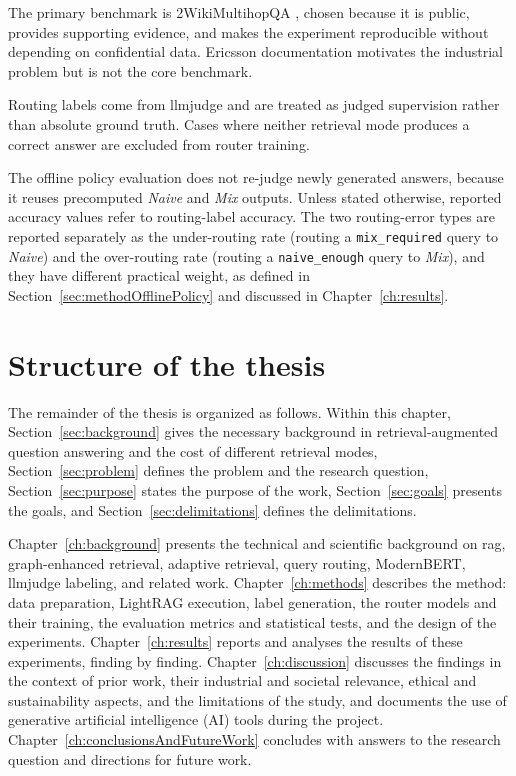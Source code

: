 \documentclass[english, bibtex]{kththesis}               %
\numberwithin{listing}{chapter}
\begin{document}
The primary benchmark is 2WikiMultihopQA \cite{ho2020twowiki}, chosen because it is public, provides supporting evidence, and makes the experiment reproducible without depending on confidential data. Ericsson documentation motivates the industrial problem but is not the core benchmark.

Routing labels come from \gls{llmjudge} and are treated as judged supervision rather than absolute ground truth. Cases where neither retrieval mode produces a correct answer are excluded from router training.

The offline policy evaluation does not re-judge newly generated answers, because it reuses precomputed \emph{Naive} and \emph{Mix} outputs. Unless stated otherwise, reported accuracy values refer to routing-label accuracy. The two routing-error types are reported separately as the under-routing rate (routing a \texttt{mix\_required} query to \emph{Naive}) and the over-routing rate (routing a \texttt{naive\_enough} query to \emph{Mix}), and they have different practical weight, as defined in Section~\ref{sec:methodOfflinePolicy} and discussed in Chapter~\ref{ch:results}.

\section{Structure of the thesis}
\label{sec:structure}

The remainder of the thesis is organized as follows. Within this chapter, Section~\ref{sec:background} gives the necessary background in retrieval-augmented question answering and the cost of different retrieval modes, Section~\ref{sec:problem} defines the problem and the research question, Section~\ref{sec:purpose} states the purpose of the work, Section~\ref{sec:goals} presents the goals, and Section~\ref{sec:delimitations} defines the delimitations.

Chapter~\ref{ch:background} presents the technical and scientific background on \gls{rag}, graph-enhanced retrieval, adaptive retrieval, query routing, ModernBERT, \gls{llmjudge} labeling, and related work. Chapter~\ref{ch:methods} describes the method: data preparation, LightRAG execution, label generation, the router models and their training, the evaluation metrics and statistical tests, and the design of the experiments. Chapter~\ref{ch:results} reports and analyses the results of these experiments, finding by finding. Chapter~\ref{ch:discussion} discusses the findings in the context of prior work, their industrial and societal relevance, ethical and sustainability aspects, and the limitations of the study, and documents the use of generative artificial intelligence (AI) tools during the project. Chapter~\ref{ch:conclusionsAndFutureWork} concludes with answers to the research question and directions for future work.
\end{document}
